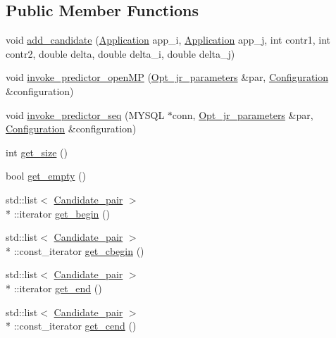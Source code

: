 \subsection*{Public Member Functions}
\begin{DoxyCompactItemize}
\item 
void \hyperlink{classCandidates_ad76cf8f7ae979cc49afd67b5fc9c702b}{add\-\_\-candidate} (\hyperlink{classApplication}{Application} app\-\_\-i, \hyperlink{classApplication}{Application} app\-\_\-j, int contr1, int contr2, double delta, double delta\-\_\-i, double delta\-\_\-j)
\item 
void \hyperlink{classCandidates_a9cc75e29ad2d0f2eb29fae2801c8e58b}{invoke\-\_\-predictor\-\_\-open\-M\-P} (\hyperlink{classOpt__jr__parameters}{Opt\-\_\-jr\-\_\-parameters} \&par, \hyperlink{classConfiguration}{Configuration} \&configuration)
\item 
void \hyperlink{classCandidates_a0f5bfe459063108d80ed8dce02c6c07b}{invoke\-\_\-predictor\-\_\-seq} (M\-Y\-S\-Q\-L $\ast$conn, \hyperlink{classOpt__jr__parameters}{Opt\-\_\-jr\-\_\-parameters} \&par, \hyperlink{classConfiguration}{Configuration} \&configuration)
\item 
int \hyperlink{classCandidates_ac10d9fe35730800bacac1d89ab117a4c}{get\-\_\-size} ()
\item 
bool \hyperlink{classCandidates_aaba3941ba950a669776a1e53fb710691}{get\-\_\-empty} ()
\item 
std\-::list$<$ \hyperlink{classCandidate__pair}{Candidate\-\_\-pair} $>$\\*
\-::iterator \hyperlink{classCandidates_a69a3001a09b54813959d2b44662f7f18}{get\-\_\-begin} ()
\item 
std\-::list$<$ \hyperlink{classCandidate__pair}{Candidate\-\_\-pair} $>$\\*
\-::const\-\_\-iterator \hyperlink{classCandidates_a9fb1fe0a56d70f0f0f4243cd7e32448a}{get\-\_\-cbegin} ()
\item 
std\-::list$<$ \hyperlink{classCandidate__pair}{Candidate\-\_\-pair} $>$\\*
\-::iterator \hyperlink{classCandidates_ad763ac469728621a81010ca7c14b4246}{get\-\_\-end} ()
\item 
std\-::list$<$ \hyperlink{classCandidate__pair}{Candidate\-\_\-pair} $>$\\*
\-::const\-\_\-iterator \hyperlink{classCandidates_a4c865dc532a6ead85200c7b66434bf71}{get\-\_\-cend} ()
\end{DoxyCompactItemize}
